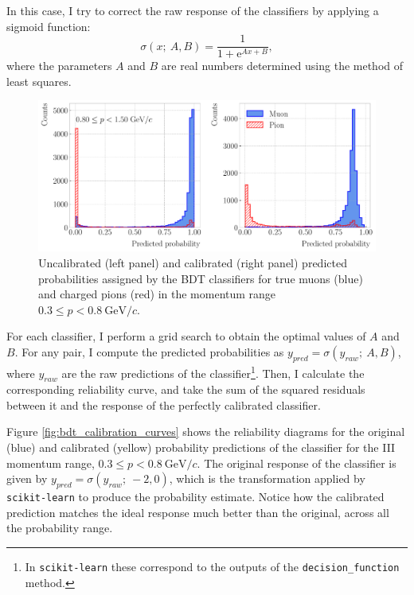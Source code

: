 In this case, I try to correct the raw response of the classifiers by applying a sigmoid function:
\begin{equation}
	\sigma(x;~A,B) = \frac{1}{1+\mathrm{e}^{Ax+B}},
\end{equation}
where the parameters $A$ and $B$ are real numbers determined using the method of least squares.

\begin{figure}[t]
	\centering
	\includegraphics[width=.95\linewidth]{Images/GArSoft_PID/BDT/ecal_bdt_output_example_calibration.pdf}
	\caption[Uncalibrated and calibrated predicted probabilities assigned by the BDT classifier in the momentum range $0.3 \leq p < 0.8 ~ \mathrm{GeV}/c$.]{Uncalibrated (left panel) and calibrated (right panel) predicted probabilities assigned by the BDT classifiers for true muons (blue) and charged pions (red) in the momentum range $0.3 \leq p < 0.8 ~ \mathrm{GeV}/c$.}
	\label{fig:bdt_calibration_output}
\end{figure}

For each classifier, I perform a grid search to obtain the optimal values of $A$ and $B$. For any pair, I compute the predicted probabilities as $y_{pred} = \sigma(y_{raw};~A,B)$, where $y_{raw}$ are the raw predictions of the classifier\footnote{In \texttt{scikit-learn} these correspond to the outputs of the \texttt{decision_function} method.}. Then, I calculate the corresponding reliability curve, and take the sum of the squared residuals between it and the response of the perfectly calibrated classifier.

Figure \ref{fig:bdt_calibration_curves} shows the reliability diagrams for the original (blue) and calibrated (yellow) probability predictions of the classifier for the III momentum range, $0.3 \leq p < 0.8 ~ \mathrm{GeV}/c$. The original response of the classifier is given by $y_{pred} = \sigma(y_{raw};~-2,0)$, which is the transformation applied by \texttt{scikit-learn} to produce the probability estimate. Notice how the calibrated prediction matches the ideal response much better than the original, across all the probability range.


